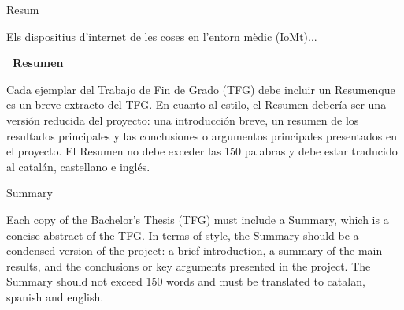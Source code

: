 

\begin{center}
  \huge\bfseries\raggedright Resum~\hrulefill
\end{center}
Els dispositius d'internet de les coses en l'entorn mèdic (IoMt)...
\begin{center}
  \huge\bfseries\raggedleft\vspace*{.5\baselineskip} \hrulefill ~Resumen
\end{center}
  Cada ejemplar del Trabajo de Fin de Grado (TFG) debe incluir un Resumenque es un breve extracto del TFG. En cuanto al estilo, el Resumen debería ser una versión reducida del proyecto: una introducción breve, un resumen de los resultados principales y las conclusiones o argumentos principales presentados en el proyecto. El Resumen no debe exceder las 150 palabras y debe estar traducido al catalán, castellano e inglés.

\begin{center}
  \huge\bfseries\raggedright\vspace*{.5\baselineskip} Summary~\hrulefill
\end{center}
  Each copy of the Bachelor's Thesis (TFG) must include a Summary, which is a concise abstract of the TFG. In terms of style, the Summary should be a condensed version of the project: a brief introduction, a summary of the main results, and the conclusions or key arguments presented in the project. The Summary should not exceed 150 words and must be translated to catalan, spanish and english.

